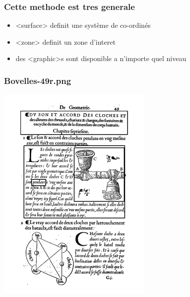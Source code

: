 \documentclass[]{beamer}\makeatletter
\begin{document}
\begin{frame}
\frametitle{ Cette methode est tres generale}\begin{itemize}

\item {\color{blue2}<surface>} definit une système de co-ordinés 
\item {\color{blue2}<zone>} definit un zone d'interet 
\item des {\color{blue2}<graphic>}s sont disponible a n'importe quel niveau 
\end{itemize} 
\end{frame}

\begin{frame}
\frametitle{ Bovelles-49r.png}\par
\includegraphics[height=300pt,]{../Graphics/facs-fig1.png}
\end{frame}
\end{document}
